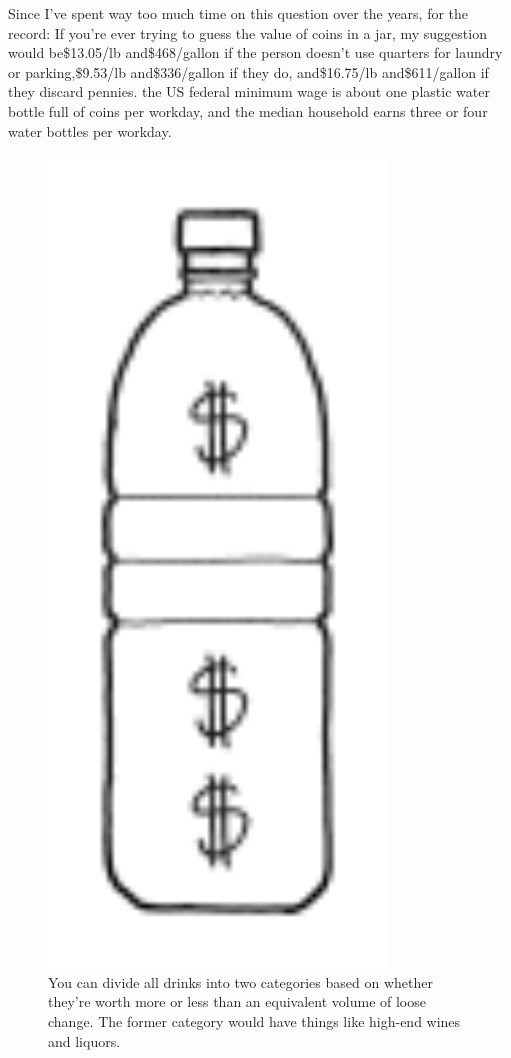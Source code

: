 {{{{Since I've spent way too much time on this question over the years, for the record: If you're ever trying to guess the value of coins in a jar, my suggestion would be\$13.05/lb and\$468/gallon if the person doesn't use quarters for laundry or parking,\$9.53/lb and\$336/gallon if they do, and\$16.75/lb and\$611/gallon if they discard pennies.} } the US federal minimum wage is about one plastic water bottle full of coins per workday, and the median household earns three or four water bottles per workday.}

\begin{figure}[!htbp]
\centering
\includegraphics[scale=0.5, max width=0.8\textwidth]{imgs/a/118/water.png}
\caption{You can divide all drinks into two categories based on whether they're worth more or less than an equivalent volume of loose change. The former category would have things like high-end wines and liquors.}
\end{figure}

}
